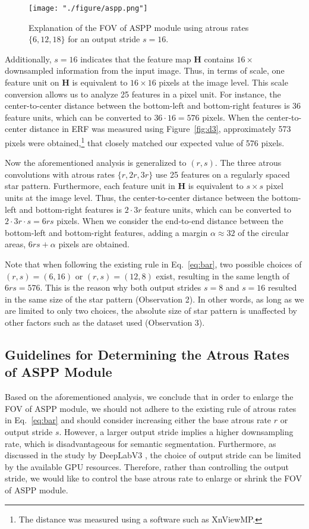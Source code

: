 \documentclass{article}
\newcommand{\bH}{\mathbf{H}}
\def\figref#1{Figure~\ref{#1}}
\def\eqref#1{Eq.~\ref{#1}}
\begin{document}
\begin{figure}[t!]
	\centering
	\texttt{[image: "./figure/aspp.png"]}
	\caption{Explanation of the FOV of ASPP module using atrous rates $\{6, 12, 18\}$ for an output stride $s=16$.}
	\label{fig:aspp}
\end{figure}

Additionally, $s=16$ indicates that the feature map $\bH$ contains $16 \times$ downsampled information from the input image. Thus, in terms of scale, one feature unit on $\bH$ is equivalent to $16 \times 16$ pixels at the image level. This scale conversion allows us to analyze 25 features in a pixel unit. For instance, the center-to-center distance between the bottom-left and bottom-right features is 36 feature units, which can be converted to $36 \cdot 16 = 576$ pixels. When the center-to-center distance in ERF was measured using \figref{fig:d3}, approximately 573 pixels were obtained,\footnote{The distance was measured using a software such as XnViewMP.} that closely matched our expected value of 576 pixels.

Now the aforementioned analysis is generalized to $(r, s)$. The three atrous convolutions with atrous rates $\{r, 2r, 3r\}$ use 25 features on a regularly spaced star pattern. Furthermore, each feature unit in $\bH$ is equivalent to $s \times s$ pixel units at the image level. Thus, the center-to-center distance between the bottom-left and bottom-right features is $2 \cdot 3r$ feature units, which can be converted to $2 \cdot 3r \cdot s = 6rs$ pixels. When we consider the end-to-end distance between the bottom-left and bottom-right features, adding a margin $\alpha \approx 32$ of the circular areas, $6rs+\alpha$ pixels are obtained.

Note that when following the existing rule in \eqref{eq:bar}, two possible choices of $(r, s) = (6, 16)$ or $(r, s) = (12, 8)$ exist, resulting in the same length of $6rs=576$. This is the reason why both output strides $s=8$ and $s=16$ resulted in the same size of the star pattern (Observation 2). In other words, as long as we are limited to only two choices, the absolute size of star pattern is unaffected by other factors such as the dataset used (Observation 3).

\subsection{Guidelines for Determining the Atrous Rates of ASPP Module}
Based on the aforementioned analysis, we conclude that in order to enlarge the FOV of ASPP module, we should not adhere to the existing rule of atrous rates in \eqref{eq:bar} and should consider increasing either the base atrous rate $r$ or output stride $s$. However, a larger output stride implies a higher downsampling rate, which is disadvantageous for semantic segmentation. Furthermore, as discussed in the study by DeepLabV3 \citep{DBLP:journals/corr/ChenPSA17}, the choice of output stride can be limited by the available GPU resources. Therefore, rather than controlling the output stride, we would like to control the base atrous rate to enlarge or shrink the FOV of ASPP module.
\end{document}
